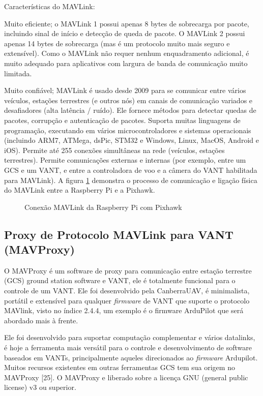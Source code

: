 Características do MAVLink:

Muito eficiente; o MAVLink 1 possui apenas 8 bytes de sobrecarga por pacote, incluindo sinal de início e detecção de queda de pacote. O MAVLink 2 possui apenas 14 bytes de sobrecarga (mas é um protocolo muito mais seguro e extensível). Como o MAVLink não requer nenhum enquadramento adicional, é muito adequado para aplicativos com largura de banda de comunicação muito limitada.

Muito confiável;  MAVLink é usado desde 2009 para se comunicar entre vários veículos, estações terrestres (e outros nós) em canais de comunicação variados e desafiadores (alta latência / ruído). Ele fornece métodos para detectar quedas de pacotes, corrupção e autenticação de pacotes.
Suporta muitas linguagens de programação, executando em vários microcontroladores e sistemas operacionais (incluindo ARM7, ATMega, dsPic, STM32 e Windows, Linux, MacOS, Android e iOS).
Permite até 255 conexões simultâneas na rede (veículos, estações terrestres).
Permite comunicações externas e internas (por exemplo, entre um GCS e um VANT, e entre a controladora de voo e a câmera do VANT habilitada para MAVLink). A figura \ref{fig:mavlink} demonstra o processo de comunicação e ligação física do MAVLink entre a Raspberry Pi e a Pixhawk.

\begin{figure}[H]
	\centering
	\caption{Conexão MAVLink da Raspberry Pi com Pixhawk}
	\fontsize{9pt}{12pt}\selectfont
	\color{black}
	\def\svgwidth{15cm}
	
	\label{fig:mavlink}
\end{figure}

\subsection{Proxy de Protocolo MAVLink para VANT (MAVProxy)}
O MAVProxy é um software de proxy para comunicação entre estação terrestre (GCS) ground station software e VANT, ele é totalmente funcional para o controle de um VANT. Ele foi desenvolvido pela CanberraUAV, é minimalista, portátil e extensível para qualquer \textit{firmware} de VANT que suporte o protocolo MAVlink, visto no índice 2.4.4, um exemplo é o firmware ArduPilot que será abordado mais à frente.

Ele foi desenvolvido para suportar computação complementar e vários datalinks, é hoje a ferramenta mais versátil para o controle e desenvolvimento de software baseados em VANTs, principalmente aqueles direcionados ao \textit{firmware} Ardupilot. Muitos recursos existentes em outras ferramentas GCS tem sua origem no MAVProxy [25]. O MAVProxy e liberado sobre a licença GNU (general public license) v3 ou superior.

